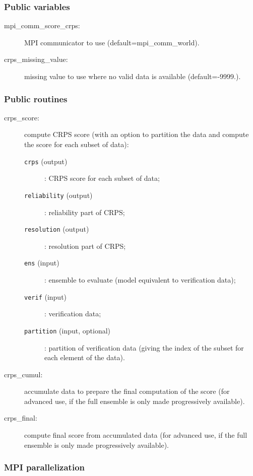 \documentclass[11pt]{article}
\begin{document}
\subsubsection*{Public variables}

\begin{description}
\item[mpi\_comm\_score\_crps:] MPI communicator to use (default=mpi\_comm\_world).
\item[crps\_missing\_value:] missing value to use where no valid data is available (default=-9999.).
\end{description}

\subsubsection*{Public routines}

\begin{description}
\item[crps\_score:] compute CRPS score (with an option to partition the data
                    and compute the score for each subset of data):
  \begin{description}
  \item[{\tt crps} (output)]: CRPS score for each subset of data;
  \item[{\tt reliability} (output)]: reliability part of CRPS;
  \item[{\tt resolution} (output)]: resolution part of CRPS;
  \item[{\tt ens} (input)]: ensemble to evaluate (model equivalent to verification data);
  \item[{\tt verif} (input)]: verification data;
  \item[{\tt partition} (input, optional)]: partition of verification data
                                  (giving the index of the subset for each element of the data).
  \end{description}
\item[crps\_cumul:] accumulate data to prepare the final computation of the score
                    (for advanced use, if the full ensemble is only made progressively available).
\item[crps\_final:] compute final score from accumulated data
                    (for advanced use, if the full ensemble is only made progressively available).
\end{description}

\subsubsection*{MPI parallelization}
\end{document}
